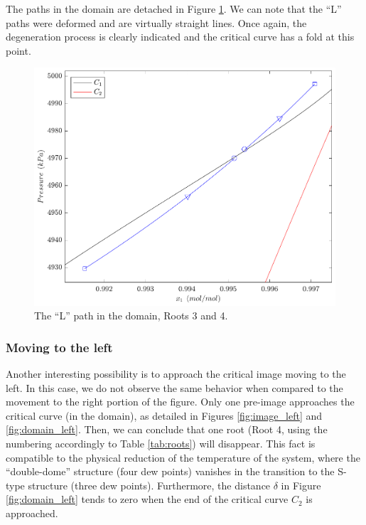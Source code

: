 \documentclass{article}
\theoremstyle{definition}
\theoremstyle{remark}
\begin{document}
The paths in the domain are detached in Figure \ref{fig:L_path_domain}. We can note that the ``L'' paths were deformed and are virtually straight lines. Once again, the degeneration process is clearly indicated and the critical curve has a fold at this point.

\begin{figure}
	\begin{center}
		\includegraphics[scale=0.50]{caminhos_L_degeneracao_dominio.pdf}
		\caption{The ``L'' path in the domain, Roots 3 and 4.}\label{fig:L_path_domain}
	\end{center}
\end{figure}

\subsubsection{Moving to the left}

Another interesting possibility is to approach the critical image moving to the left. In this case, we do not observe the same behavior when compared to the movement to the right portion of the figure. Only one pre-image approaches the critical curve (in the domain), as detailed in Figures \ref{fig:image_left} and \ref{fig:domain_left}. Then, we can conclude that one root (Root 4, using the numbering accordingly to Table \ref{tab:roots}) will disappear. This fact is compatible to the physical reduction of the temperature of the system, where the ``double-dome'' structure (four dew points) vanishes in the transition to the S-type structure (three dew points). Furthermore, the distance $\delta$ in Figure \ref{fig:domain_left} tends to zero when the end of the critical curve $C_2$ is approached. 
\end{document}
